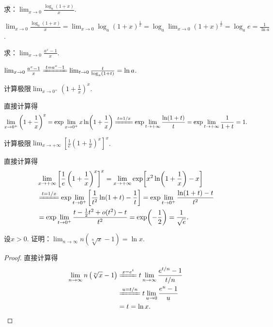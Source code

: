 \begin{example}
求：\(\lim_{x\to0} \frac{\log_a (1+x)}{x}\).
\begin{solution}
\(\lim_{x\to0} \frac{\log_a (1+x)}{x}
= \lim_{x\to0} \log_a (1+x)^{\frac{1}{x}}
= \log_a \lim_{x\to0} (1+x)^{\frac{1}{x}}
= \log_a e
= \frac{1}{\ln a}\).
\end{solution}
\end{example}

\begin{example}
求：\(\lim_{x\to0} \frac{a^x - 1}{x}\).
\begin{solution}
\(\lim_{x\to0} \frac{a^x - 1}{x}
\xlongequal{t=a^x-1} \lim_{t\to0}\frac{t}{\log_a (1+t)}
= \ln a\).
\end{solution}
\end{example}

\begin{example}
计算极限\(\lim_{x\to0^+} \left(1+\frac1x\right)^x\).
\begin{solution}
直接计算得\[
	\lim_{x\to0^+} \left(1+\frac1x\right)^x
	= \exp\lim_{x\to0^+} x\ln(1+\frac1x) %
	\xlongequal{t=1/x} \exp\lim_{t\to+\infty} \frac{\ln(1+t)}{t} %
	= \exp\lim_{t\to+\infty} \frac1{1+t} %
	= 1.
\]
\end{solution}
\end{example}

\begin{example}
计算极限\(\lim_{x\to+\infty} \left[ \frac1e \left(1+\frac1x\right)^x \right]^x\).
\begin{solution}
直接计算得\begin{align*}
	&\lim_{x\to+\infty} \left[ \frac1e \left(1+\frac1x\right)^x \right]^x
	= \lim_{x\to+\infty} \exp[x^2 \ln(1+\frac1x) - x] \\
	&\xlongequal{t=1/x} \exp\lim_{t\to0^+} \left[ \frac1{t^2} \ln(1+t) - \frac1t \right]
	= \exp\lim_{t\to0^+} \frac{\ln(1+t)-t}{t^2} \\
	&= \exp\lim_{t\to0^+} \frac{t-\frac12t^2+o(t^2)-t}{t^2}
	= \exp(-\frac12)
	= \frac1{\sqrt{e}}.
\end{align*}
\end{solution}
\end{example}

\begin{example}
设\(x>0\).
证明：\(\lim_{n\to\infty} n \left( \sqrt[n]{x} - 1 \right) = \ln x\).
\begin{proof}
直接计算得\begin{align*}
	\lim_{n\to\infty} n \left( \sqrt[n]{x} - 1 \right)
	&\xlongequal{x = e^t} t \lim_{n\to\infty} \frac{e^{t/n} - 1}{t/n} \\
	&\xlongequal{u=t/n} t \lim_{u\to0} \frac{e^u - 1}u \\
	&= t
	= \ln x.
	\qedhere
\end{align*}
\end{proof}
\end{example}

